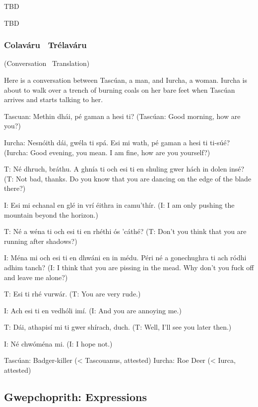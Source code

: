 \begingroup
\fontsize{10pt}{12pt}\selectfont
\begin{leftbubbles}TBD\end{leftbubbles}
\begin{rightbubbles}TBD\end{rightbubbles}
\endgroup

\newpage
\subsubsection{Colav\'{a}ru \textendash\ Tr\'{e}lav\'{a}ru}
(Conversation \textendash\ Translation)

Here is a conversation between Tasc\'{u}an, a man, and Iurcha, a woman. Iurcha is about to walk over a trench of burning coals on her bare feet when Tasc\'{u}an arrives and starts talking to her.

Tascuan: Methin dh\'{a}i, p\'{e} gaman a hesi ti?
(Tasc\'{u}an: Good morning, how are you?)

Iurcha: Nesn\'{o}ith d\'{a}i, gw\'{e}la ti sp\'{a}. Esi mi wath, p\'{e} gaman a hesi ti ti-s\'{u}\'{e}?
(Iurcha: Good evening, you mean. I am fine, how are you yourself?)

T: N\'{e} dhruch, br\'{a}thu. A ghn\'{i}a ti och esi ti en shuling gwer h\'{a}ch in dolen ins\'{e}?
(T: Not bad, thanks. Do you know that you are dancing on the edge of the blade there?)

I: Esi mi echanal en gl\'{e} in vr\'{i} \'{e}ithra in camu'th\'{i}r.
(I: I am only pushing the mountain beyond the horizon.)

T: N\'{e} a w\'{e}na ti och esi ti en rh\'{e}thi \'{o}s 'c\'{a}th\'{e}?
(T: Don't you think that you are running after shadows?)

I: M\'{e}na mi och esi ti en dhw\'{a}ni en in m\'{e}du. P\'{e}ri n\'{e} a gonechughra ti ach r\'{o}dhi adhim tanch?
(I: I think that you are pissing in the mead. Why don't you fuck off and leave me alone?)

T: Esi ti rh\'{e} vurw\'{a}r.
(T: You are very rude.)

I: Ach esi ti en vedh\'{o}li im\'{i}.
(I: And you are annoying me.)

T: D\'{a}i, athapis\'{i} mi ti gwer sh\'{i}rach, duch.
(T: Well, I'll see you later then.)

I: N\'{e} chw\'{o}m\'{e}na mi.
(I: I hope not.)

Tasc\'{u}an: Badger-killer (< Tascouanus, attested)
Iurcha: Roe Deer (< Iurca, attested)

\subsection{Gwepchoprith: Expressions}
